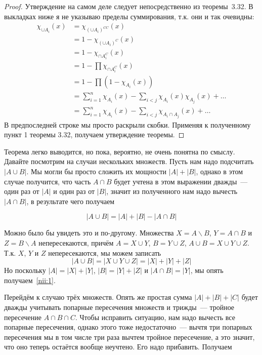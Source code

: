 \begin{proof}
Утверждение на самом деле следует непосредственно из теоремы~3.32. В выкладках ниже я не указываю пределы суммирования, т.к. они и так очевидны:
\begin{align*}
\chi_{\cup A_i}(x) &= \chi_{(\cup A_i)^{CC}}(x) \\
&= 1 -  \chi_{(\cup A_i)^C}(x) \\
&= 1 - \chi_{\cap A_i^C}(x) \\
&= 1 - \prod \chi_{\cap A_i^C}(x) \\
&= 1 - \prod (1 - \chi_{A_i}(x)) \\
&= \sum_{i=1}^n\chi_{A_i}(x) - \sum_{i<j}\chi_{A_i}(x)\chi_{A_j}(x) +\ldots\\
&= \sum_{i=1}^n\chi_{A_i}(x) - \sum_{i<j}\chi_{A_i\cap A_j}(x) +\ldots
\end{align*}
В предпоследней строке мы просто раскрыли скобки. Применяя к полученному пункт 1 теоремы 3.32, получаем утверждение теоремы.
\end{proof}

Теорема легко выводится, но пока, вероятно, не очень понятна по смыслу. Давайте посмотрим на случаи нескольких множеств. Пусть нам надо подсчитать $|A\cup B|$. Мы могли бы просто сложить их мощности $|A| + |B|$, однако в этом случае получится, что часть $A\cap B$ будет учтена в этом выражении дважды~--- один раз от $|A|$ и  один раз от $|B|$, значит из полученного нам надо вычесть $|A\cap B|$, в результате чего получаем

\begin{equation}\label{nii:1}
|A\cup B| = |A| + |B| - |A\cap B|
\end{equation}

Можно было бы увидеть это и по-другому. Множества $X = A\backslash B$, $Y = A\cap B$ и $Z = B\backslash A$ непересекаются, причём $A = X\cup Y$, $B = Y\cup Z$, $A\cup B = X\cup Y \cup Z$. Т.к. $X$, $Y$ и $Z$ непересекаются, мы можем записать
$$|A\cup B| = |X\cup Y\cup Z| = |X| + |Y| + |Z|$$
Но поскольку $|A| = |X| + |Y|$, $|B| = |Y| + |Z|$ и $|A\cap B| = |Y|$, мы опять получаем~\eqref{nii:1}.

Перейдём к случаю трёх множеств. Опять же простая сумма $|A|+|B|+|C|$ будет дважды учитывать попарные пересечения множеств и трижды~--- тройное пересечение $A\cap B\cap C$. Чтобы исправить ситуацию, нам надо вычесть все попарные пересечения, однако этого тоже недостаточно~--- вычтя три попарных пересечения мы в том числе три раза вычтем тройное пересечение, а это значит, что оно теперь остаётся вообще неучтено. Его надо прибавить. Получаем

